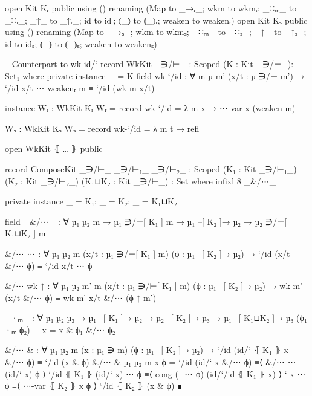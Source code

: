 \begin{code}
    open Kit Kᵣ public using () renaming 
      (Map to _→ᵣ_; wkm to wkmᵣ; _∷ₘ_ to _∷ᵣ_; _↑_ to _↑ᵣ_; id to idᵣ; ⦅_⦆ to ⦅_⦆ᵣ; weaken to weakenᵣ)
    open Kit Kₛ public using () renaming 
      (Map to _→ₛ_; wkm to wkmₛ; _∷ₘ_ to _∷ₛ_; _↑_ to _↑ₛ_; id to idₛ; ⦅_⦆ to ⦅_⦆ₛ; weaken to weakenₛ)

    -- Counterpart to wk-id/`
    record WkKit {_∋/⊢_ : Scoped} (K : Kit _∋/⊢_): Set₁ where
      private instance _ = K
      field
        wk-`/id :
          ∀ m {µ m'} (x/t : µ ∋/⊢ m')
          → `/id x/t ⋯ weakenᵣ m ≡ `/id (wk m x/t)

    instance
      Wᵣ : WkKit Kᵣ
      Wᵣ = record { wk-`/id = λ m x → ⋯-var x (weaken m) }

      Wₛ : WkKit Kₛ
      Wₛ = record { wk-`/id = λ m t → refl }

    open WkKit ⦃ … ⦄ public

    record ComposeKit {_∋/⊢_ _∋/⊢₁_ _∋/⊢₂_ : Scoped} (K₁ : Kit _∋/⊢₁_) (K₂ : Kit _∋/⊢₂_) (K₁⊔K₂ : Kit _∋/⊢_) : Set where
      infixl  8  _&/⋯_

      private instance _ = K₁; _ = K₂; _ = K₁⊔K₂

      field
        _&/⋯_ :
          ∀ {µ₁} {µ₂} {m} → µ₁ ∋/⊢[ K₁ ] m → µ₁ –[ K₂ ]→ µ₂ → µ₂ ∋/⊢[ K₁⊔K₂ ] m

        &/⋯-⋯ :
          ∀ {µ₁} {µ₂} {m} (x/t : µ₁ ∋/⊢[ K₁ ] m) (ϕ : µ₁ –[ K₂ ]→ µ₂) 
          → `/id (x/t &/⋯ ϕ) ≡ `/id x/t ⋯ ϕ

        &/⋯-wk-↑ :
          ∀ {µ₁} {µ₂} {m'} {m} (x/t : µ₁ ∋/⊢[ K₁ ] m) (ϕ : µ₁ –[ K₂ ]→ µ₂)
          → wk m' (x/t &/⋯ ϕ) ≡ wk m' x/t &/⋯ (ϕ ↑ m')

      _·ₘ_ : ∀ {µ₁ µ₂ µ₃} → µ₁ –[ K₁ ]→ µ₂ → µ₂ –[ K₂ ]→ µ₃ → µ₁ –[ K₁⊔K₂ ]→ µ₃
      (ϕ₁ ·ₘ ϕ₂) _ x = x & ϕ₁ &/⋯ ϕ₂ 

      &/⋯-& :
        ∀ {µ₁} {µ₂} {m} (x : µ₁ ∋ m) (ϕ : µ₁ –[ K₂ ]→ µ₂) 
        → `/id (id/` ⦃ K₁ ⦄ x &/⋯ ϕ) ≡ `/id (x & ϕ)
      &/⋯-& {µ₁} {µ₂} {m} x ϕ = 
          `/id (id/` x &/⋯ ϕ)      ≡⟨ &/⋯-⋯ (id/` x) ϕ ⟩
          `/id ⦃ K₁ ⦄ (id/` x) ⋯ ϕ ≡⟨ cong (_⋯ ϕ) (id/`/id ⦃ K₁ ⦄ x) ⟩
          ` x ⋯ ϕ                  ≡⟨ ⋯-var ⦃ K₂ ⦄ x ϕ ⟩
          `/id ⦃ K₂ ⦄  (x & ϕ)     ∎


\end{code}
